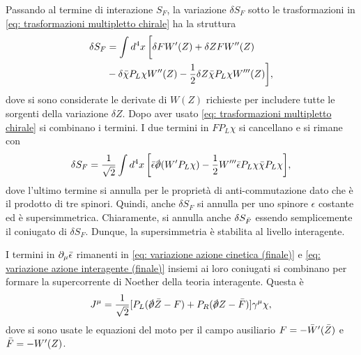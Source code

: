 Passando al termine di interazione $S_F$, la variazione $\delta S_F$ sotto le trasformazioni in \eqref{eq: trasformazioni multipletto chirale} ha la struttura 
\begin{equation}
    \begin{split}
        \delta S_F &= \int d^4x\,\bigg[\delta FW'(Z) + \delta ZFW''(Z) \\
        &- \delta\bar{\chi}P_L\chi W''(Z) - \frac{1}{2}\delta Z\bar{\chi}P_L\chi W'''(Z)\bigg],
    \end{split}
\end{equation}
dove si sono considerate le derivate di $W(Z)$ richieste per includere tutte le sorgenti della variazione $\delta Z$. Dopo aver usato \eqref{eq: trasformazioni multipletto chirale} si combinano i termini. I due termini in $FP_L\chi$ si cancellano e si rimane con 
\begin{equation}
\label{eq: variazione azione interagente (finale)}
    \delta S_F = \frac{1}{\sqrt{2}}\int d^4x\,\bigg[\b{\epsilon}\sl{\p}(W'P_L\chi) - \frac{1}{2}W'''\b{\epsilon}P_L\chi\b{\chi}P_L\chi\bigg],
\end{equation}
dove l'ultimo termine si annulla per le proprietà di anti-commutazione dato che è il prodotto di tre spinori. Quindi, anche $\delta S_F$ si annulla per uno spinore $\epsilon$ costante ed è supersimmetrica. Chiaramente, si annulla anche $\delta S_{\bar{F}}$ essendo semplicemente il coniugato di $\delta S_F$. Dunque, la supersimmetria è stabilita al livello interagente. 

I termini in $\partial_\mu\bar{\epsilon}$ rimanenti in \eqref{eq: variazione azione cinetica (finale)} e \eqref{eq: variazione azione interagente (finale)} insiemi ai loro coniugati si combinano per formare la supercorrente di Noether della teoria interagente. Questa è 
\begin{equation}
    J^\mu = \frac{1}{\sqrt{2}}[P_L(\sl{\p}\b{Z} - F) + P_R(\sl{\p}Z - \b{F})]\gamma^\mu\chi,
\end{equation}
dove si sono usate le equazioni del moto per il campo ausiliario $F = -\bar{W}'(\bar{Z})$ e $\bar{F} = -W'(Z)$.

